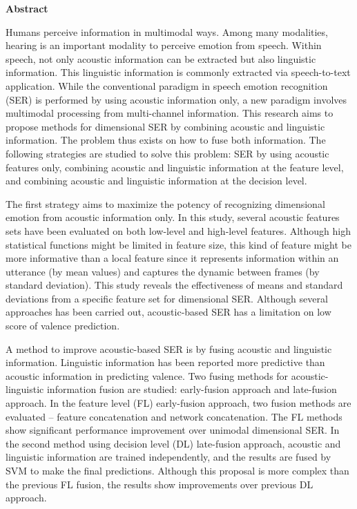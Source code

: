 \strut
\vspace{20pt}

\begin{center}
{\LARGE\bf Abstract}
\end{center}
\vspace{20pt}

Humans perceive information in multimodal ways. Among many modalities, hearing
is an important modality to perceive emotion from speech. Within speech, not
only acoustic information can be extracted but also linguistic information.
This linguistic information is commonly extracted via speech-to-text
application. While the conventional paradigm in  speech emotion recognition
(SER) is performed by using acoustic information only, a new paradigm involves
multimodal processing from multi-channel information. This research aims to
propose methods for dimensional SER by combining acoustic and linguistic
information. The problem thus exists on how to fuse both information. The
following strategies are studied to solve this problem: SER by using acoustic
features only, combining acoustic and linguistic information at the feature
level, and combining acoustic and linguistic information at the decision level.


The first strategy aims to maximize the potency
of recognizing dimensional emotion from acoustic information only. In this
study, several acoustic features sets have been evaluated on both low-level and
high-level features. Although high statistical functions might be limited in
feature size, this kind of feature might be more informative than a local
feature since it represents information within an utterance (by mean values)
and captures the dynamic between frames (by standard deviation). This study
reveals the effectiveness of means and standard
deviations from a specific feature set for dimensional SER.  Although several
approaches has been carried out, acoustic-based SER has a limitation on low
score of valence prediction.

A method to improve acoustic-based SER is by fusing acoustic and linguistic
information. Linguistic information has been reported more predictive than
acoustic information in predicting valence. Two fusing methods for
acoustic-linguistic information fusion are studied: early-fusion approach and
late-fusion approach. In the feature level (FL) early-fusion approach, two fusion methods are evaluated -- feature concatenation and
network concatenation. The FL methods show
significant performance improvement over unimodal dimensional SER. In the
second method using decision level (DL) late-fusion approach, acoustic and
linguistic information are trained independently, and the results are fused by
SVM to make the final predictions. Although this proposal is more complex than
the previous FL fusion, the results show improvements over previous DL
approach.

